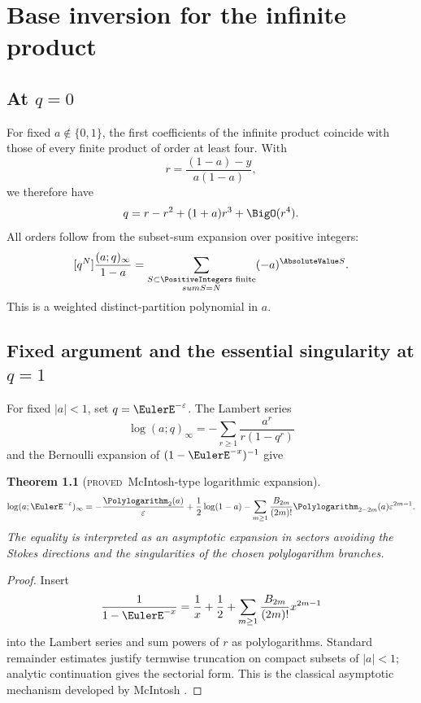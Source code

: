 \documentclass[11pt,letterpaper,oneside,openany]{book}
\newtheorem{theorem}{Theorem}[chapter]
\theoremstyle{definition}
\theoremstyle{remark}
\newcommand{\statusproved}{\textcolor{provedgreen}{\textsc{proved}}}
\begin{document}
\chapter{Base inversion for the infinite product}

\section{At \(q=0\)}
For fixed \(a\notin\{0,1\}\), the first coefficients of the infinite product
coincide with those of every finite product of order at least four.  With
\[
 r=\frac{(1-a)-y}{a(1-a)},
\]
we therefore have
\begin{equation}
 q=r-r^2+(1+a)r^3+\BigO(r^4).
 \label{eq:infinite-base-zero-inverse}
\end{equation}
All orders follow from the subset-sum expansion over positive integers:
\[
 [q^N]\frac{(a;q)_\infty}{1-a}
 =\sum_{\substack{S\subset\PositiveIntegers\text{ finite}\\sum S=N}}(-a)^{\AbsoluteValue S}.
\]
This is a weighted distinct-partition polynomial in \(a\).

\section{Fixed argument and the essential singularity at \(q=1\)}
For fixed \(|a|<1\), set \(q=\EulerE^{-\varepsilon}\).  The Lambert series
\[
 \log(a;q)_\infty=-\sum_{r\ge1}\frac{a^r}{r(1-q^r)}
\]
and the Bernoulli expansion of \((1-\EulerE^{-x})^{-1}\) give
\begin{theorem}[\statusproved\ McIntosh-type logarithmic expansion]
\begin{equation}
 \log(a;\EulerE^{-\varepsilon})_\infty
 =-\frac{\Polylogarithm_2(a)}{\varepsilon}
 +\frac12\log(1-a)
 -\sum_{m\ge1}\frac{B_{2m}}{(2m)!}
 \Polylogarithm_{2-2m}(a)\varepsilon^{2m-1}.
 \label{eq:infinite-q1-forward}
\end{equation}
The equality is interpreted as an asymptotic expansion in sectors avoiding the
Stokes directions and the singularities of the chosen polylogarithm branches.
\end{theorem}
\begin{proof}
Insert
\[
 \frac1{1-\EulerE^{-x}}=\frac1x+\frac12+
 \sum_{m\ge1}\frac{B_{2m}}{(2m)!}x^{2m-1}
\]
into the Lambert series and sum powers of \(r\) as polylogarithms.  Standard
remainder estimates justify termwise truncation on compact subsets of
\(|a|<1\); analytic continuation gives the sectorial form.  This is the
classical asymptotic mechanism developed by McIntosh \cite{McIntosh1999}.
\end{proof}
\end{document}
